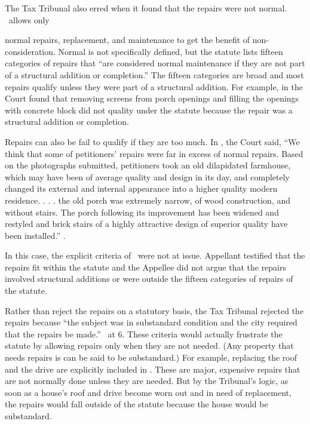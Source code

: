 \documentclass[12pt,\documentclassflag]{michiganCourtOfAppealsBrief}
\def\mathieuGast{\pincite[l]{MCL}{211.27(2)}}
\begin{document}
The Tax Tribunal also erred when it found that the repairs were not normal. \mathieuGast\ allows only {normal repairs, replacement, and maintenance to get the benefit of non-consideration. Normal is not specifically defined, but the statute lists fifteen categories of repairs that ``are considered normal maintenance if they are not part of a structural addition or completion.'' The fifteen categories are broad and most repairs qualify unless they were part of a structural addition. For example, in \cite{Coyne} the Court found that removing screens from porch openings and filling the openings with concrete block did not quality under the statute because the repair was a structural addition or completion.

  Repairs can also be fail to qualify if they are too much. In \cite{Fisher}, the Court said, ``We think that some of petitioners' repairs were far in excess of normal repairs. Based on the photographs submitted, petitioners took an old dilapidated farmhouse, which may have been of average quality and design in its day, and completely changed its external and internal appearance into a higher quality modern residence. . . . the old porch was extremely narrow, of wood construction, and without stairs. The porch following its improvement has been widened and restyled and brick stairs of a highly attractive design of superior quality have been installed.'' .

  In this case, the explicit criteria of \mathieuGast\ were not at issue. Appellant testified that the repairs fit within the statute and the Appellee did not argue that the repairs involved structural additions or were outside the fifteen categories of repairs of the statute.

  Rather than reject the repairs on a statutory basis, the Tax Tribunal rejected the repairs because ``the subject was in substandard condition and the city required that the repairs be made.'' \POJ\ at 6. These criteria would actually frustrate the statute by allowing repairs only when they are not needed. (Any property that needs repairs is can be said to be substandard.) For example, replacing the roof and the drive are explicitly included in . These are major, expensive repairs that are not normally done unless they are needed. But by the Tribunal's logic, as soon as a house's roof and drive become worn out and in need of replacement, the repairs would fall outside of the statute because the house would be substandard.

}
\end{document}
